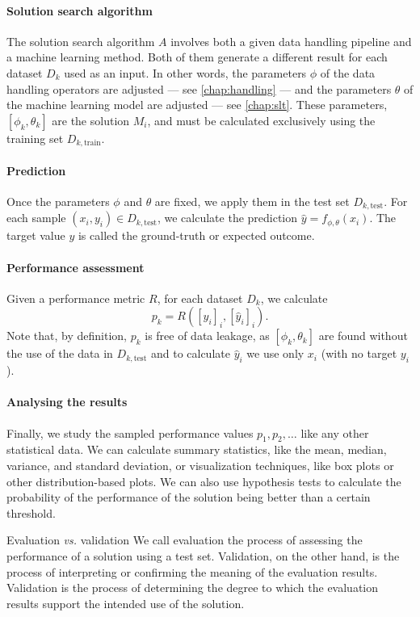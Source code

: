\paragraph{Solution search algorithm}  The solution search algorithm $A$ involves both a
given data handling pipeline and a machine learning method.  Both of them generate a
different result for each dataset $D_k$ used as an input.  In other words, the parameters
$\phi$ of the data handling operators are adjusted --- see \cref{chap:handling} --- and the
parameters $\theta$ of the machine learning model are adjusted --- see \cref{chap:slt}.
These parameters, $\left[\phi_k, \theta_k\right]$ are the solution $M_i$, and must be
calculated exclusively using the training set $D_{k,\text{train}}$.

\paragraph{Prediction}  Once the parameters $\phi$ and $\theta$ are fixed, we apply them
in the test set $D_{k,\text{test}}$.  For each sample $(x_i, y_i) \in D_{k,\text{test}}$,
we calculate the prediction $\hat{y} = f_{\phi,\theta}(x_i)$.  The target value $y$ is
called the ground-truth or expected outcome.

\paragraph{Performance assessment} Given a performance metric $R$, for each dataset $D_k$,
we calculate
$$p_k = R\!\left(\left[y_i\right]_i, \left[\hat{y}_i\right]_i\right)\text{.}$$
Note that, by definition, $p_k$ is free of data leakage, as $\left[\phi_k,
\theta_k\right]$ are found without the use of the data in $D_{k,\text{test}}$ and to
calculate $\hat{y}_i$ we use only $x_i$ (with no target $y_i$).

\paragraph{Analysing the results} Finally, we study the sampled performance values $p_1,
p_2, \ldots$ like any other statistical data.  We can calculate summary statistics, like
the mean, median, variance, and standard deviation, or visualization techniques, like
box plots or other distribution-based plots.  We can also use hypothesis tests to
calculate the probability of the performance of the solution being better than a certain
threshold.

\begin{mainbox}{Evaluation \emph{vs.} validation}
  We call evaluation the process of assessing the performance of a solution using a
  test set.  Validation, on the other hand, is the process of interpreting or confirming
  the meaning of the evaluation results.  Validation is the process of determining the
  degree to which the evaluation results support the intended use of the solution.
\end{mainbox}

